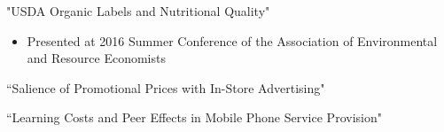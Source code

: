 \documentclass[10pt]{article} %
\begin{document}
\begin{minipage}[t]{0.46\textwidth}
"USDA Organic Labels and Nutritional Quality"
    \begin{itemize}
        \item Presented at 2016 Summer Conference 
of the Association of Environmental and Resource Economists
    \end{itemize} 

``Salience of Promotional Prices with In-Store Advertising" \\

\vspace{2mm}

``Learning Costs and Peer Effects in Mobile Phone Service Provision"


\vspace{-2mm}



\end{minipage} %
\end{document}
